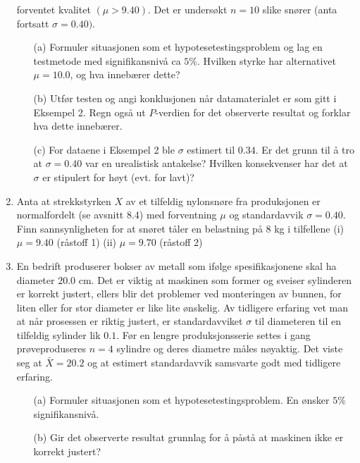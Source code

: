\begin{enumerate}
          forventet kvalitet $(\mu> 9.40)$. Det er undersøkt
          $n=10$ slike snører (anta fortsatt $\sigma=0.40)$.
 \begin{itemize}
  \item[(a)]  Formuler situasjonen som et hypotesetestingsproblem og
          lag en testmetode med signifikansnivå ca $5\%$.
          Hvilken styrke har alternativet $\mu=10.0$, og hva
          innebærer dette?
  \item[(b)]  Utfør testen og angi konklusjonen når
          datamaterialet er som gitt i Eksempel 2. Regn også
          ut $P$-verdien for det observerte resultat og forklar hva
          dette innebærer.
  \item[(c)]  For dataene i Eksempel 2 ble $\sigma$ estimert til
          $0.34$. Er det grunn til å tro at $\sigma=0.40$ var
          en urealistisk antakelse? Hvilken konsekvenser har det
          at $\sigma$ er stipulert for høyt (evt. for lavt)?
 \end{itemize}
\item     Anta at strekkstyrken $X$ av et tilfeldig nylonsnøre
          fra produksjonen er normalfordelt (se avsnitt 8.4) med
          forventning $\mu$ og standardavvik $\sigma=0.40$. Finn
          sannsynligheten for at snøret tåler en
          belastning på $8$ kg i tilfellene
          (i) $\mu=9.40$ (råstoff 1)  (ii) $\mu=9.70$ (råstoff 2)
\item     En bedrift produserer bokser av metall som ifølge
          spesifikasjonene skal ha diameter $20.0$ cm. Det er
          viktig at maskinen som former og sveiser sylinderen er
          korrekt justert, ellers blir det problemer ved
          monteringen av bunnen, for liten eller for stor
          diameter er like lite ønskelig. Av tidligere
          erfaring vet man at når prosessen er riktig justert,
          er standardavviket $\sigma$ til diameteren til en
          tilfeldig sylinder lik $0.1$. Før en lengre
          produksjonsserie settes i gang prøveproduseres $n=4$
          sylindre og deres diametre måles nøyaktig. Det
          viste seg at $\bar X=20.2$ og at estimert standardavvik
          samsvarte godt med tidligere erfaring.
 \begin{itemize}
  \item[(a)]  Formuler situasjonen som et
               hypotesetestingsproblem. En ønsker $5\%$
               signifikansnivå.
  \item[(b)]  Gir det observerte resultat grunnlag for å
               påstå at maskinen ikke er korrekt justert?

\end{itemize}
\end{enumerate}
